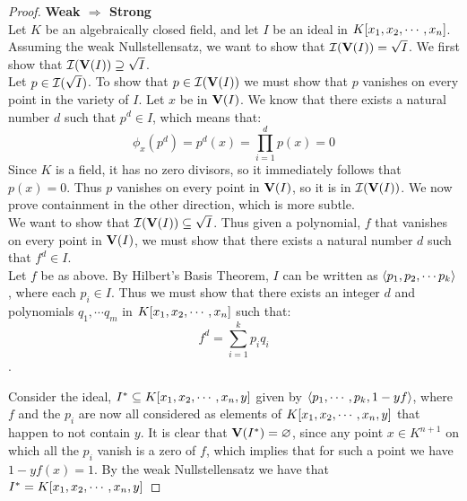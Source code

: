 \documentclass[twoside]{report}
\begin{document}
\begin{proof} \textbf{Weak $\Rightarrow$ Strong}\\
  
  Let $K$ be an algebraically closed field, and let $I$ be an ideal in
  $K[x_1, x_2,\cdots,x_n]$.  Assuming the weak Nullstellensatz, we want to show
  that $\mathcal{I}(\mathbf{V}(I)) = \sqrt{I}$.  We first show that
  $\mathcal{I}(\mathbf{V}(I)) \supseteq \sqrt{I}$.\\

  Let $p \in \mathcal{I}(\sqrt{I})$.  To show that $p \in
  \mathcal{I}(\mathbf{V}(I))$ we must show that $p$ vanishes on every
  point in the variety of $I$.  Let $x$ be in $\mathbf{V}(I)$.  We know
  that there exists a natural number $d$ such that $p^d \in I$, which
  means that: 
  $$\phi_x(p^d) = p^d(x) = \prod\limits_{i=1}^d p(x) = 0$$
  Since $K$ is a field, it has no zero divisors, so it immediately
  follows that $p(x) = 0$.  Thus $p$ vanishes on every point in
  $\mathbf{V}(I)$, so it is in $\mathcal{I}(\mathbf{V}(I))$.  We now prove
  containment in the other direction, which is more subtle.\\

  We want to show that $\mathcal{I}(\mathbf{V}(I)) \subseteq \sqrt{I}$.
  Thus given a polynomial, $f$ that vanishes on every point in
  $\mathbf{V}(I)$, we must show that there exists a natural number $d$
  such that $f^d \in I$. \\

  Let $f$ be as above.  By Hilbert's Basis Theorem, $I$ can be written
  as $\langle p_1, p_2, \cdots p_k\rangle$, where each $p_i \in I$.  Thus we
  must show that there exists an integer $d$ and polynomials $q_1,
  \cdots q_m$ in $K[x_1, x_2,\cdots,x_n]$ such that: 
  $$f^d = \sum\limits_{i=1}^k p_iq_i$$.
  
  Consider the ideal, $I^* \subseteq K[x_1, x_2,\cdots,x_n, y]$ given by $\langle p_1,
    \cdots, p_k, 1 - yf\rangle$, where $f$ and the $p_i$ are now all
  considered as elements of $K[x_1, x_2,\cdots,x_n, y]$ that happen to not contain
  $y$. It is clear that $\mathbf{V}(I^*) = \varnothing$, since any point
  $x \in K^{n+1}$ on which all the $p_i$ vanish is a zero of $f$,
  which implies that for such a point we have $1-yf(x) = 1$.  By the
  weak Nullstellensatz we have that $I^* = K[x_1, x_2,\cdots,x_n, y]$
  
  
  

  
  

  

\end{proof}



  


  



\end{document}
